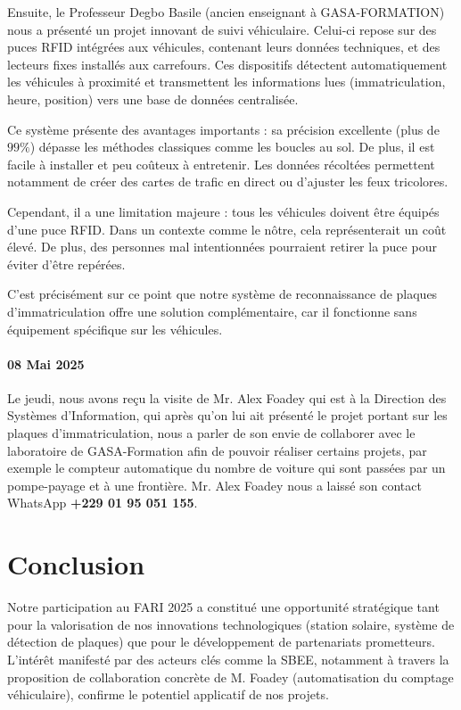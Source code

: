 \documentclass[12pt, a4paper]{article}
\begin{document}
Ensuite, le Professeur Degbo Basile (ancien enseignant à GASA-FORMATION) nous a présenté un projet innovant de suivi véhiculaire. Celui-ci repose sur des puces RFID intégrées aux véhicules, contenant leurs données techniques, et des lecteurs fixes installés aux carrefours. Ces dispositifs détectent automatiquement les véhicules à proximité et transmettent les informations lues (immatriculation, heure, position) vers une base de données centralisée.

Ce système présente des avantages importants : sa précision excellente (plus de $99\%$) dépasse les méthodes classiques comme les boucles au sol. De plus, il est facile à installer et peu coûteux à entretenir. Les données récoltées permettent notamment de créer des cartes de trafic en direct ou d’ajuster les feux tricolores.

Cependant, il a une limitation majeure : tous les véhicules doivent être équipés d’une puce RFID. Dans un contexte comme le nôtre, cela représenterait un coût élevé. De plus, des personnes mal intentionnées pourraient retirer la puce pour éviter d’être repérées.

C’est précisément sur ce point que notre système de reconnaissance de plaques d’immatriculation offre une solution complémentaire, car il fonctionne sans équipement spécifique sur les véhicules.

\paragraph{08 Mai 2025}
Le jeudi, nous avons reçu la visite de Mr. Alex Foadey qui est à la Direction des Systèmes d’Information, qui après qu’on lui ait présenté le projet portant sur les plaques d’immatriculation,  nous a parler de son envie de collaborer avec le laboratoire de GASA-Formation afin de pouvoir réaliser certains projets, par exemple le compteur automatique du nombre de voiture qui sont passées par un pompe-payage et à une frontière.
Mr. Alex Foadey nous a laissé son contact WhatsApp \textbf{+229 01 95 051 155}.


\section{Conclusion}
Notre participation au FARI 2025 a constitué une opportunité stratégique tant pour la valorisation de nos innovations technologiques (station solaire, système de détection de plaques) que pour le développement de partenariats prometteurs. L’intérêt manifesté par des acteurs clés comme la SBEE, notamment à travers la proposition de collaboration concrète de M. Foadey (automatisation du comptage véhiculaire), confirme le potentiel applicatif de nos projets.
\end{document}
